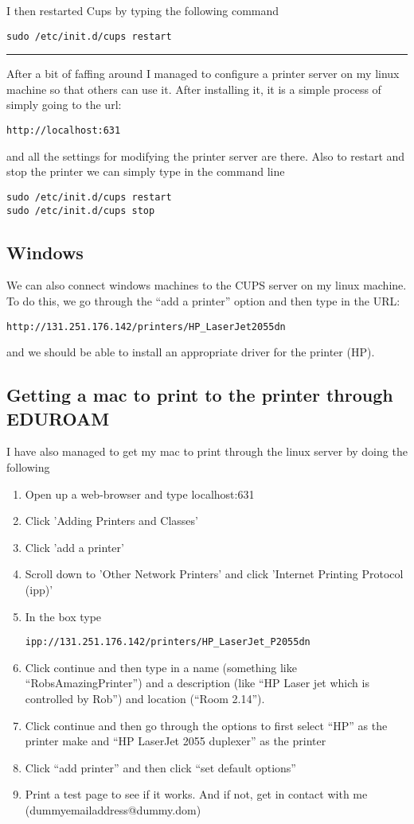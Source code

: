 \documentclass[a4paper, 10pt]{article}
\newcommand{\mybotrule}{\vspace{4mm}\hrule}
\begin{document}
I then restarted Cups by typing the following command
\begin{verbatim}
sudo /etc/init.d/cups restart
\end{verbatim}

\mybotrule

After a bit of faffing around I managed to configure a printer server on my linux machine so that others can use it. After installing it, it is a simple process of simply going to the url:
\begin{verbatim}
http://localhost:631
\end{verbatim}
and all the settings for modifying the printer server are there. Also to restart and stop the printer we can simply type in the command line
\begin{verbatim}
sudo /etc/init.d/cups restart
sudo /etc/init.d/cups stop
\end{verbatim}

\subsection*{Windows}
We can also connect windows machines to the CUPS server on my linux machine. To do this, we go through the ``add a printer'' option and then type in the URL:
\begin{verbatim}
http://131.251.176.142/printers/HP_LaserJet2055dn
\end{verbatim}
and we should be able to install an appropriate driver for the printer (HP).
%

\subsection*{Getting a mac to print to the printer through EDUROAM}

I have also managed to get my mac to print through the linux server by doing the following
\begin{enumerate}
\item Open up a web-browser and type localhost:631
\item Click 'Adding Printers and Classes'
\item Click 'add a printer'
\item Scroll down to 'Other Network Printers' and click 'Internet Printing Protocol (ipp)'
\item In the box type 
\begin{verbatim}
ipp://131.251.176.142/printers/HP_LaserJet_P2055dn
\end{verbatim}
\item Click continue and then type in a name (something like ``RobsAmazingPrinter'') and a description (like ``HP Laser jet which is controlled by Rob'') and location (``Room 2.14'').
\item Click continue and then go through the options to first select ``HP'' as the printer make and ``HP LaserJet 2055 duplexer'' as the printer
\item Click ``add printer'' and then click ``set default options''
\item Print a test page to see if it works. And if not, get in contact with me (dummyemailaddress@dummy.dom) 
\end{enumerate}
\end{document}
